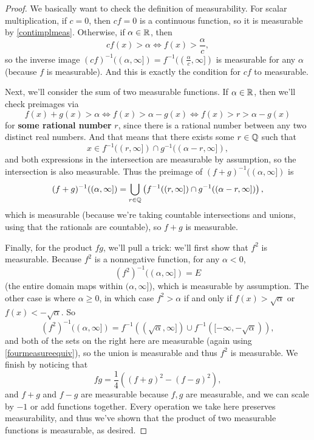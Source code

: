 \begin{proof}
We basically want to check the definition of measurability. For scalar multiplication, if $c = 0$, then $cf = 0$ is a continuous function, so it is measurable by \cref{contimplmeas}. Otherwise, if $\alpha \in \mathbb R$, then 
\[
    cf(x) > \alpha \iff f(x) > \frac{\alpha}{c},
\]
so the inverse image $(cf)^{-1}((\alpha, \infty]) = f^{-1}((\frac{\alpha}{c}, \infty])$ is measurable for any $\alpha$ (because $f$ is measurable). And this is exactly the condition for $cf$ to measurable. 

Next, we'll consider the sum of two measurable functions. If $\alpha \in \mathbb R$, then we'll check preimages via
\[
    f(x) + g(x) > \alpha \iff f(x) > \alpha - g(x) \iff f(x) > r > \alpha - g(x)
\]
for \textbf{some rational number} $r$, since there is a rational number between any two distinct real numbers. And that means that there exists some $r \in \mathbb Q$ such that 
\[
    x \in f^{-1}((r, \infty]) \cap g^{-1}((\alpha - r, \infty]),
\]
and both expressions in the intersection are measurable by assumption, so the intersection is also measurable. Thus the preimage of $(f+g)^{-1}((\alpha, \infty])$ is
\[
    (f+g)^{-1}((\alpha, \infty]) = \bigcup_{r \in \mathbb Q} \left(f^{-1}((r, \infty]) \cap g^{-1}((\alpha - r, \infty])\right),
\]
which is measurable (because we're taking countable intersections and unions, using that the rationals are countable), so $f+g$ is measurable. 

Finally, for the product $fg$, we'll pull a trick: we'll first show that $f^2$ is measurable. Because $f^2$ is a nonnegative function, for any $\alpha < 0$,
\[
    (f^2)^{-1}((\alpha, \infty]) = E
\]
(the entire domain maps within $(\alpha, \infty]$), which is measurable by assumption. The other case is where $\alpha \ge 0$, in which case $f^2 > \alpha$ if and only if $f(x) > \sqrt{\alpha}$ or $f(x) < -\sqrt{\alpha}$. So
\[
    (f^2)^{-1}((\alpha, \infty]) = f^{-1}((\sqrt{\alpha}, \infty]) \cup f^{-1}([-\infty, -\sqrt{\alpha})),
\]
and both of the sets on the right here are measurable (again using \cref{fourmeasureequiv}), so the union is measurable and thus $f^2$ is measurable. We finish by noticing that 
\[
    fg = \frac{1}{4} \left((f + g)^2 - (f-g)^2\right),
\]
and $f+g$ and $f-g$ are measurable because $f, g$ are measurable, and we can scale by $-1$ or add functions together. Every operation we take here preserves measurability, and thus we've shown that the product of two measurable functions is measurable, as desired.
\end{proof}

